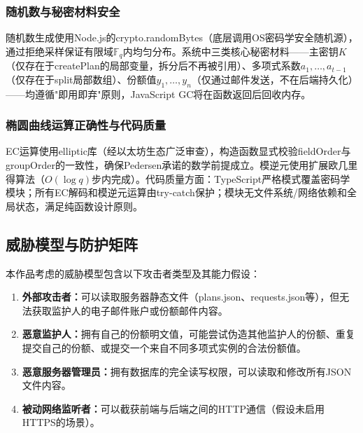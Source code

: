 \documentclass[UTF8,a4paper,zihao=-4,openany]{ctexrep}
\begin{document}
\subsubsection{随机数与秘密材料安全}

随机数生成使用Node.js的crypto.randomBytes（底层调用OS密码学安全随机源），通过拒绝采样保证有限域$\mathbb{F}_q$内均匀分布。系统中三类核心秘密材料——主密钥$K$（仅存在于createPlan的局部变量，拆分后不再被引用）、多项式系数$a_1,\dots,a_{t-1}$（仅存在于split局部数组）、份额值$y_1,\dots,y_n$（仅通过邮件发送，不在后端持久化）——均遵循"即用即弃"原则，JavaScript GC将在函数返回后回收内存。

\subsubsection{椭圆曲线运算正确性与代码质量}

EC运算使用elliptic库（经以太坊生态广泛审查），构造函数显式校验fieldOrder与groupOrder的一致性，确保Pedersen承诺的数学前提成立。模逆元使用扩展欧几里得算法（$O(\log q)$步内完成）。代码质量方面：TypeScript严格模式覆盖密码学模块；所有EC解码和模逆元运算由try-catch保护；模块无文件系统/网络依赖和全局状态，满足纯函数设计原则。

\subsection{威胁模型与防护矩阵}

本作品考虑的威胁模型包含以下攻击者类型及其能力假设：

\begin{enumerate}
  \item \textbf{外部攻击者：}可以读取服务器静态文件（plans.json、requests.json等），但无法获取监护人的电子邮件账户或份额邮件内容。
  \item \textbf{恶意监护人：}拥有自己的份额明文值，可能尝试伪造其他监护人的份额、重复提交自己的份额、或提交一个来自不同多项式实例的合法份额值。
  \item \textbf{恶意服务器管理员：}拥有数据库的完全读写权限，可以读取和修改所有JSON文件内容。
  \item \textbf{被动网络监听者：}可以截获前端与后端之间的HTTP通信（假设未启用HTTPS的场景）。
\end{enumerate}
\end{document}
